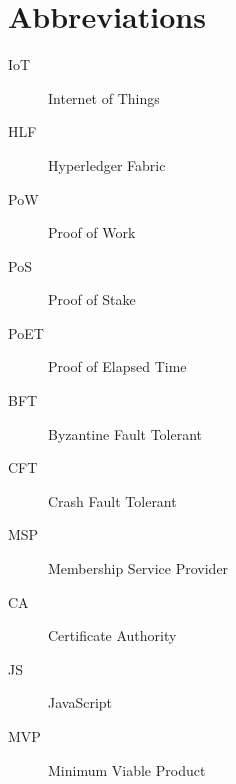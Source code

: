 \chapter*{Abbreviations}\label{abbr}
\begin{description}
    \item[IoT] Internet of Things
    \item[HLF] Hyperledger Fabric
    \item[PoW] Proof of Work
    \item[PoS] Proof of Stake
    \item[PoET] Proof of Elapsed Time
    \item[BFT] Byzantine Fault Tolerant
    \item[CFT] Crash Fault Tolerant
    \item[MSP] Membership Service Provider
    \item[CA] Certificate Authority
    \item[JS] JavaScript
    \item[MVP] Minimum Viable Product
\end{description}
